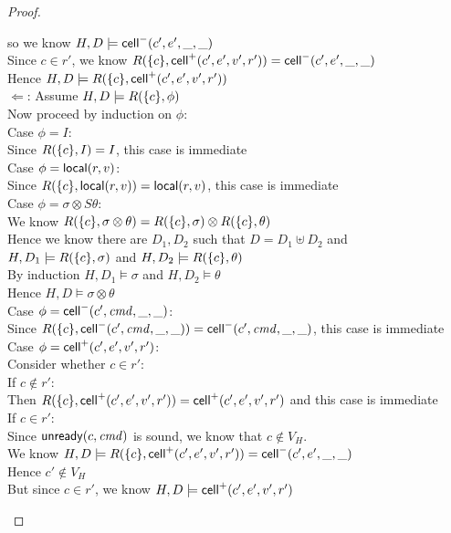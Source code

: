 \begin{proof}
\begin{itemize}
\begin{tabbedproof}
\oooox so we know $H, D \models \mathsf{cell}^{-}({c'}, {e'}, {\_}, {\_})$ \\
\ooooo Since $c \in r'$, we know $R(\{{c}\}, \mathsf{cell}^{+}({c'}, {e'}, {v'}, {r'})) = \mathsf{cell}^{-}({c'}, {e'}, {\_}, {\_})$ \\
\ooooo Hence $H, D \models R(\{{c}\}, \mathsf{cell}^{+}({c'}, {e'}, {v'}, {r'}))$ \\
\oo $\Leftarrow$: Assume $H, D \models R(\{{c}\}, \phi)$ \\
\ooo Now proceed by induction on $\phi$: \\
\ooo Case $\phi = I$: \\
\oooo Since $R(\{{c}\}, I) = I$, this case is immediate \\
\ooo Case $\phi = \mathsf{local}({r}, {v})$: \\
\oooo Since $R(\{{c}\}, \mathsf{local}({r}, {v})) = \mathsf{local}({r}, {v})$, this case is immediate \\
\ooo Case $\phi = \sigma \otimes S\theta$: \\
\oooo We know $R(\{{c}\}, \sigma \otimes \theta) = R(\{{c}\}, \sigma) \otimes R(\{{c}\}, \theta)$ \\
\oooo Hence we know there are $D_1, D_2$ such that $D = D_1 \uplus D_2$ and \\
\ooox $H, D_1 \models R(\{{c}\}, \sigma)$ and $H, D_2 \models R(\{{c}\}, \theta)$ \\
\oooo By induction $H, D_1 \models \sigma$ and $H, D_2 \models \theta$ \\
\oooo Hence $H, D \models \sigma \otimes \theta$ \\
\ooo Case $\phi = \mathsf{cell}^{-}({c'}, {\mathit{cmd}}, {\_}, {\_})$: \\
\oooo Since $R(\{{c}\}, \mathsf{cell}^{-}({c'}, {\mathit{cmd}}, {\_}, {\_})) = \mathsf{cell}^{-}({c'}, {\mathit{cmd}}, {\_}, {\_})$, this case is immediate \\
\ooo Case $\phi = \mathsf{cell}^{+}({c'}, {e'}, {v'}, {r'})$: \\
\oooo Consider whether $c \in r'$: \\
\oooo If $c \not\in r'$: \\
\ooooo Then $R(\{{c}\}, \mathsf{cell}^{+}({c'}, {e'}, {v'}, {r'})) = \mathsf{cell}^{+}({c'}, {e'}, {v'}, {r'})$ and this case is immediate \\
\oooo If $c \in r'$: \\
\ooooo Since $\mathsf{unready}({c}, {\mathit{cmd}})$ is sound, we know that $c \not\in V_H$. \\ 
\ooooo We know $H, D \models R(\{{c}\}, \mathsf{cell}^{+}({c'}, {e'}, {v'}, {r'})) = \mathsf{cell}^{-}({c'}, {e'}, {\_}, {\_})$ \\
\ooooo Hence $c' \not\in V_H$ \\
\ooooo But since $c \in r'$, we know $H, D \models \mathsf{cell}^{+}({c'}, {e'}, {v'}, {r'})$ \\
\end{tabbedproof}




\end{itemize}
\end{proof}
